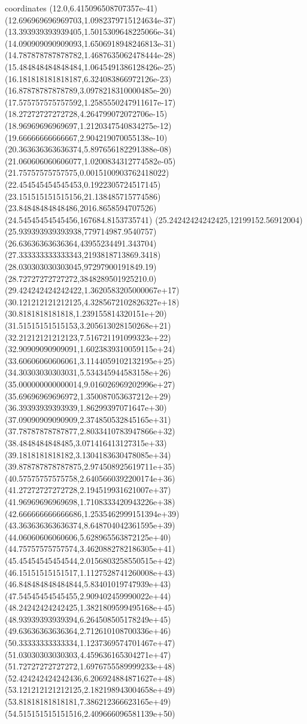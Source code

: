coordinates {%
(12.0,6.415096508707357e-41)
(12.696969696969703,1.0982379715124634e-37)
(13.393939393939405,1.5015309648225066e-34)
(14.090909090909093,1.6506918948246813e-31)
(14.787878787878782,1.4687635062478444e-28)
(15.484848484848484,1.0645491386128426e-25)
(16.181818181818187,6.324083866972126e-23)
(16.87878787878789,3.0978218310000485e-20)
(17.575757575757592,1.2585550247911617e-17)
(18.27272727272728,4.264799072072706e-15)
(18.96969696969697,1.2120347540834275e-12)
(19.66666666666667,2.904219070055138e-10)
(20.363636363636374,5.897656182291388e-08)
(21.060606060606077,1.0200834312774582e-05)
(21.75757575757575,0.0015100903762418022)
(22.454545454545453,0.1922305724517145)
(23.151515151515156,21.138485715774586)
(23.84848484848486,2016.8658594707526)
(24.54545454545456,167684.8153735741)
(25.24242424242425,12199152.56912004)
(25.939393939393938,779714987.9540757)
(26.63636363636364,43955234491.343704)
(27.333333333333343,2193818713869.3418)
(28.030303030303045,97297900191849.19)
(28.72727272727272,3848289501925210.0)
(29.424242424242422,1.3620583205000067e+17)
(30.121212121212125,4.3285672102826327e+18)
(30.8181818181818,1.239155814320151e+20)
(31.51515151515153,3.205613028150268e+21)
(32.21212121212123,7.516721191099323e+22)
(32.90909090909091,1.6023839310059115e+24)
(33.60606060606061,3.1144059102132195e+25)
(34.30303030303031,5.534345944583158e+26)
(35.000000000000014,9.016026969202996e+27)
(35.69696969696972,1.350087053637212e+29)
(36.39393939393939,1.86299397071647e+30)
(37.09090909090909,2.374850532845165e+31)
(37.78787878787877,2.8033410783947866e+32)
(38.4848484848485,3.071416413127315e+33)
(39.1818181818182,3.1304183630478085e+34)
(39.878787878787875,2.974508925619711e+35)
(40.57575757575758,2.6405660392200174e+36)
(41.27272727272728,2.194519931621007e+37)
(41.96969696969698,1.7108333420943226e+38)
(42.666666666666686,1.2535462999151394e+39)
(43.363636363636374,8.648704042361595e+39)
(44.06060606060606,5.628965563872125e+40)
(44.75757575757574,3.4620882782186305e+41)
(45.45454545454544,2.0156803258550515e+42)
(46.15151515151517,1.1127528741260008e+43)
(46.848484848484844,5.83401019747939e+43)
(47.54545454545455,2.909402459990022e+44)
(48.24242424242425,1.3821809599495168e+45)
(48.93939393939394,6.264508505178249e+45)
(49.63636363636364,2.712610108700336e+46)
(50.33333333333334,1.1237369574701467e+47)
(51.03030303030303,4.459636165304271e+47)
(51.72727272727272,1.6976755589999233e+48)
(52.424242424242436,6.206924884871627e+48)
(53.121212121212125,2.182198943004658e+49)
(53.81818181818181,7.386212366623165e+49)
(54.515151515151516,2.409666096581139e+50)
}
